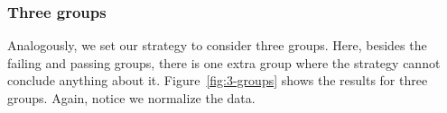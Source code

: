 \subsubsection{Three groups}

\label{sec:three-groups}

Analogously, we set our strategy to consider three groups. Here, besides the failing and passing groups, there is one extra group where the strategy cannot conclude anything about it. Figure~\ref{fig:3-groups} shows the results for three groups. Again, notice we normalize the data.

\begin{figure}[!ht]
     \begin{center}
\end{center}
\end{figure}
